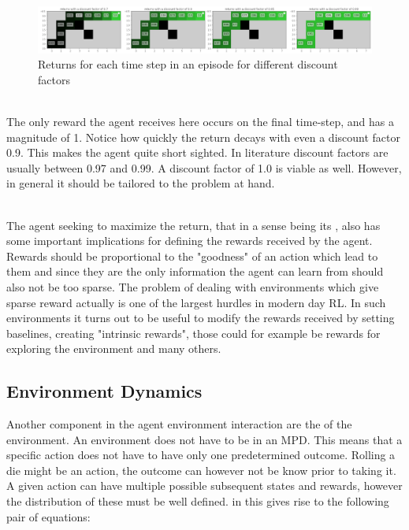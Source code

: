 \begin{figure}[h!]
    \centering
    \includegraphics[width=\linewidth]{figures/grid_world_discount_factors.png}
    \caption{Returns for each time step in an episode for different discount factors}
    \label{fig:grid_world_discount_factors}
\end{figure}

\noindent
\\ The only reward the agent receives here occurs on the final time-step, and has a magnitude of 1. Notice how quickly the return decays with even a discount factor 0.9. This makes the agent quite short sighted. In literature discount factors are usually between 0.97 and 0.99. A discount factor of 1.0 is viable as well. However, in general it should be tailored to the problem at hand.

\noindent
\\ The agent seeking to maximize the return, that in a sense being its , also has some important implications for defining the rewards received by the agent. Rewards should be proportional to the "goodness" of an action which lead to them and since they are the only information the agent can learn from should also not be too sparse.  The problem of dealing with environments which give sparse reward actually is one of the largest hurdles in modern day RL. In such environments it turns out to be useful to modify the rewards received by setting baselines, creating "intrinsic rewards", those could for example be rewards for exploring the environment and many others.

\subsection{Environment Dynamics}

Another component in the agent environment interaction are the  of the environment. An environment does not have to be  in an MPD. This means that a specific action does not have to have only one predetermined outcome. Rolling a die might be an action, the outcome can however not be know prior to taking it. A given action can have multiple possible subsequent states and rewards, however the distribution of these must be well defined. in  this gives rise to the following pair of equations:

